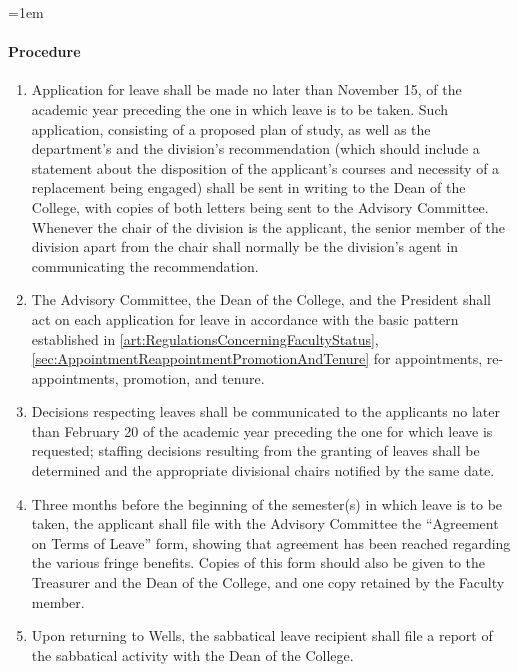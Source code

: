 \documentclass{manual}
\let\oldparagraph\paragraph
\renewcommand\paragraph{\leftskip=1em\oldparagraph}
\newcommand{\itemLevelA}{\alph*.}
\newcommand{\itemRefA}{\alph*}
\begin{document}
\paragraph{Procedure}
\begin{enumerate}[label=\itemLevelA,ref=\itemRefA]
\item Application for leave shall be made no later than November 15, of the academic year preceding the one in which leave is to be taken. Such application, consisting of a proposed plan of study, as well as the department's and the division's recommendation (which should include a statement about the disposition of the applicant's courses and necessity of a replacement being engaged) shall be sent in writing to the Dean of the College, with copies of both letters being sent to the Advisory Committee. Whenever the chair of the division is the applicant, the senior member of the division apart from the chair shall normally be the division's agent in communicating the recommendation.

\item The Advisory Committee, the Dean of the College, and the President shall act on each application for leave in accordance with the basic pattern established in \cref{art:RegulationsConcerningFacultyStatus}, \cref{sec:AppointmentReappointmentPromotionAndTenure} for appointments, re- appointments, promotion, and tenure.

\item Decisions respecting leaves shall be communicated to the applicants no later than February 20 of the academic year preceding the one for which leave is requested; staffing decisions resulting from the granting of leaves shall be determined and the appropriate divisional chairs notified by the same date.

\item Three months before the beginning of the semester(s) in which leave is to be taken, the applicant shall file with the Advisory Committee the ``Agreement on Terms of Leave'' form, showing that agreement has been reached regarding the various fringe benefits. Copies of this form should also be given to the Treasurer and the Dean of the College, and one copy retained by the Faculty member.

\item Upon returning to Wells, the sabbatical leave recipient shall file a report of the sabbatical activity with the Dean of the College.
\end{enumerate}
\end{document}
